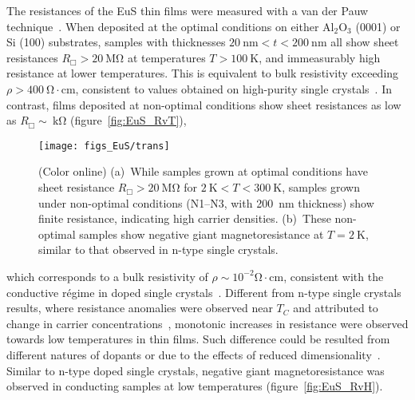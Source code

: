 The resistances of the EuS thin films were measured with a van der Pauw technique~\cite{VdP1958}. When deposited at the optimal conditions on either Al$_2$O$_3$ (0001) or Si (100) substrates, samples with thicknesses $20~\mathrm{nm}<t<200~\mathrm{nm}$ all show sheet resistances $R_\Box>20~\mathrm{M\Omega}$ at temperatures $T > 100~\mathrm{K}$, and immeasurably  high resistance at lower temperatures. This is equivalent to bulk resistivity exceeding  $\rho>400~\mathrm{\Omega\cdot{}cm}$, consistent to values obtained on high-purity single crystals~\cite{EuS_Shafer}. In contrast, films deposited at non-optimal conditions show sheet resistances as low as $R_\Box\sim~\mathrm{k\Omega}$ (figure~\ref{fig:EuS_RvT}), %
%
\begin{figure}[ht]%
    \subfloat{\label{fig:EuS_RvT}}%
    \subfloat{\label{fig:EuS_RvH}}%
    \centering%
    \texttt{[image: figs\_EuS/trans]}%
    \caption[Electrical properties of EuS thin films]{\label{fig:EuS_transport}(Color online) (a)~While samples grown at optimal conditions have sheet resistance $R_\Box>20~\mathrm{M\Omega}$ for $2~\mathrm{K}<T<300~\mathrm{K}$, samples grown under non-optimal conditions (N1--N3, with 200~nm thickness) show finite resistance, indicating high carrier densities. (b)~These non-optimal samples show negative giant magnetoresistance at $T=2~\mathrm{K}$, similar to that observed in n-type single crystals.}%
\end{figure}%
%
which corresponds to a bulk resistivity of $\rho\sim10^{-2}\mathrm{\Omega\cdot{}cm}$, consistent with the conductive r\'egime in doped single crystals~\cite{EuS_ntype}. Different from n-type single crystals results, where resistance anomalies were observed near $T_C$ and attributed to change in carrier concentrations~\cite{EuS_ntype, EuX_doped_transport}, monotonic increases in resistance were observed towards low temperatures in thin films. Such difference could be resulted from different natures of dopants or due to the effects of reduced dimensionality~\cite{2D_conduction}. Similar to n-type doped single crystals, negative giant magnetoresistance was observed in conducting samples at low temperatures (figure~\ref{fig:EuS_RvH}).


